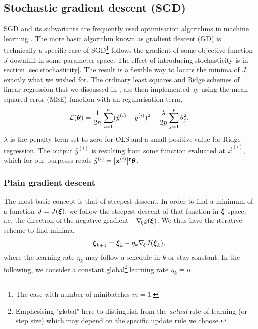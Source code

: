 \subsection{Stochastic gradient descent (SGD)}\label{sec:stochastic_gradient_descent}
    SGD and its subvariants are frequently used optimisation algorithms in machine learning \citep{Goodfellow2016}. The more basic algorithm known as gradient descent (GD) is technically a specific case of SGD\footnote{The case with number of minibatches $m=1$.} follows the gradient of some objective function $J$ downhill in some parameter space. The effect of introducing stochasticity is  in section \ref{sec:stochasticity}. The result is a flexible way to locate the minima of  $J$, exactly what we wished for. The ordinary least squares and Ridge schemes of linear regression that we discussed in \projectOne, are then implemented by using the mean squared error (MSE) function with an \lnorm[2] regularisation term,
    \begin{equation}\label{eq:linear_regression_cost_function}
        \mathcal{L}(\boldsymbol{\theta}) = \frac{1}{2n} \sum_{i=1}^n (\hat{y}^{(i)}-y^{(i)})^2 + \frac{\lambda}{2p} \sum_{j=1}^{p} \theta_j^2. 
    \end{equation}
    $\lambda$ is the penalty term set to zero for OLS and a small positive value for Ridge regression. The output $\hat{y}^{(i)}$ is resulting from some function evaluated at $\vec{x}^{(i)}$, which for our purposes reads $\hat{y}^{(i)} = [\mathbf{x}^{(i)}]^\intercal \boldsymbol{\theta}$.

    \fillertext

 
    \subsubsection{Plain gradient descent}\label{sec:plain_gradient_descent}
        The most basic concept is that of steepest descent. In order to find a minimum of a function $J=J(\boldsymbol{\xi})$, we follow the steepest descent of that function in $\boldsymbol{\xi}$-space, i.e. the direction of the negative gradient $-\nabla_{\!\xi} \varrho(\boldsymbol{\xi})$. We thus have the iterative scheme to find minima,
        \begin{align}\label{eq:steepest_descent}
            \boldsymbol{\xi}_{k+1} = \boldsymbol{\xi}_k - \eta_k\nabla_{\!\xi} J(\boldsymbol{\xi}_k),
        \end{align}
        where the learning rate $\eta_k$ may follow a schedule in $k$ or stay constant. In the following, we consider a constant global\footnote{Emphesising "global" here to distinguish from the \textit{actual} rate of learning (or step size) which may depend on the specific update rule we choose.} learning rate $\eta_k=\eta$.

